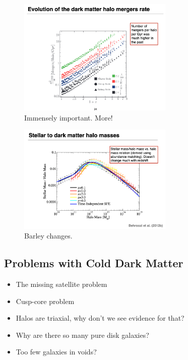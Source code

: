 \documentclass{article}
\begin{document}
\begin{figure}
    \centering
\includegraphics[width=0.66\textwidth]{figs/Screen Shot 2021-10-13 at 10.49.08 AM.png}
    \caption{Immensely important. More!}
    \label{fig:chungpeimakesanappearance_3}
\end{figure}

\begin{figure}
    \centering
\includegraphics[width=0.66\textwidth]{figs/Screen Shot 2021-10-13 at 10.49.36 AM.png}
    \caption{Barley changes.}
    \label{fig:chungpeimakesanappearance_4}
\end{figure}

\subsection{Problems with Cold Dark Matter}

\begin{itemize}
    \item The missing satellite problem
    \item Cusp-core problem
    \item Halos are triaxial, why don't we see evidence for that?
    \item Why are there so many pure disk galaxies?
    \item Too few galaxies in voids?
\end{itemize}
\end{document}
